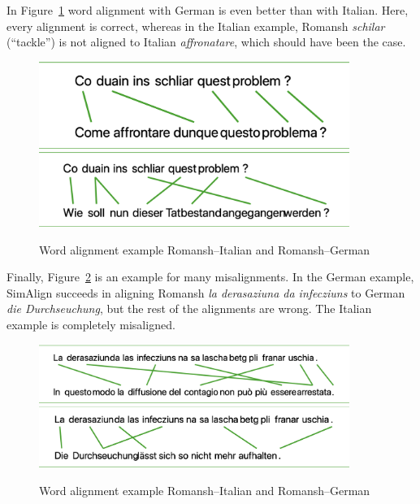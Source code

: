 In Figure~\ref{fig:co} word alignment with German is even better than with Italian. 
Here, every alignment is correct, whereas in the Italian example, Romansh \emph{schilar} (\enquote{tackle}) is not aligned to Italian \emph{affronatare}, which should have been the case.


\begin{figure}
	\includegraphics[width=0.9\textwidth]{graphics/alignments/it/co-it.png}
	\includegraphics[width=0.9\textwidth]{graphics/alignments/it/co-de.png}
	\caption{Word alignment example Romansh--Italian and Romansh--German}
	\label{fig:co}
\end{figure}


Finally, Figure~\ref{fig:durchseuchung} is an example for many misalignments. 
In the German example, SimAlign succeeds in aligning Romansh \emph{la derasaziuna da infecziuns} to German \emph{die Durchseuchung}, but the rest of the alignments are wrong. 
The Italian example is completely misaligned.

\begin{figure}
	\includegraphics[width=0.9\textwidth]{graphics/alignments/it/durchseuchung-it.png}
	\includegraphics[width=0.9\textwidth]{graphics/alignments/it/durchseuchung-rm.png}
	\caption{Word alignment example Romansh--Italian and Romansh--German}
	\label{fig:durchseuchung}
\end{figure}

